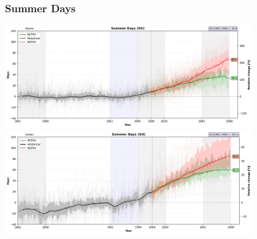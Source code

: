 \documentclass[14pt,usenames,dvipsnames]{beamer}
\begin{document}
%
%
\begin{frame}
\frametitle{Summer Days}
\begin{center}

{\includegraphics[width=0.8\textwidth]{risultati/su_Alpine_Models_ts_lim_120}} 
{\includegraphics[width=0.8\textwidth]{risultati/su_Andes_Models_ts_lim_120}}
\end{center}
\end{frame}
\end{document}

